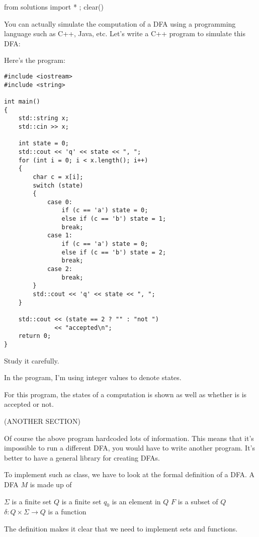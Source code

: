 \begin{python0}
from solutions import * ; clear()
\end{python0}

You can actually simulate the computation
of a DFA using a programming language such as C++, Java, etc.
Let's write a C++ program to simulate this DFA:



Here's the program:
\begin{Verbatim}[frame=single, fontsize=\small]
#include <iostream>
#include <string>

int main()
{
    std::string x;
    std::cin >> x;

    int state = 0;
    std::cout << 'q' << state << ", ";
    for (int i = 0; i < x.length(); i++)
    {
        char c = x[i];
        switch (state)
        {
            case 0:
                if (c == 'a') state = 0;
                else if (c == 'b') state = 1;
                break;
            case 1:
                if (c == 'a') state = 0;
                else if (c == 'b') state = 2;
                break;
            case 2:
                break;
        } 
        std::cout << 'q' << state << ", ";
    }
   
    std::cout << (state == 2 ? "" : "not ")
              << "accepted\n";
    return 0;
}
\end{Verbatim}
Study it carefully.

In the program, I'm using integer values to denote states.

For this program, the states of a computation is shown as well as whether is
is accepted or not.



(ANOTHER SECTION)

Of course the above program hardcoded lots of information.
This means that it's impossible to run a different DFA, you would have to
write another program.
It's better to have a general library for creating DFAs.

To implement such as class, we have to look at the
formal definition of a DFA.
A DFA $M$ is made up of
\begin{enumerate}[label=\textnormal{(\alph*)},itemsep=0pt,nosep,noitemsep,partopsep=0pt,topsep=0pt,parsep=0pt]
  \li $\Sigma$ is a finite set
  \li $Q$ is a finite set
  \li $q_0$ is an element in $Q$
  \li $F$ is a subset of $Q$
  \li $\delta: Q \times \Sigma \rightarrow Q$ is a function 
\end{enumerate}
The definition makes it clear that we need to implement
sets and functions.

